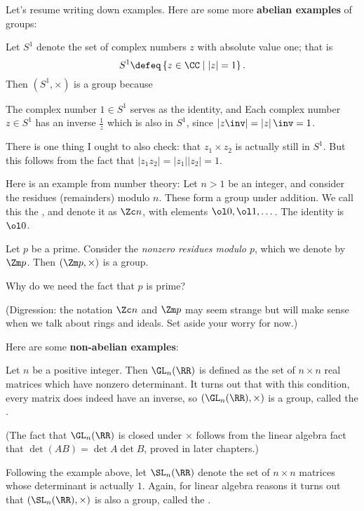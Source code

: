 Let's resume writing down examples.
Here are some more \textbf{abelian examples} of groups:
\begin{example}
	Let $S^1$ denote the set of complex numbers $z$ with absolute value one; that is
	\[ S^1 \defeq \left\{ z \in \CC \mid \left\lvert z \right\rvert = 1 \right\}. \]
	Then $(S^1, \times)$ is a group because
	\begin{itemize}
		\ii The complex number $1 \in S^1$ serves as the identity, and
		\ii Each complex number $z \in S^1$ has an inverse $\frac 1z$ which is also in $S^1$, since $\left\lvert z\inv \right\rvert = \left\lvert z \right\rvert\inv = 1$.
	\end{itemize}
	There is one thing I ought to also check: that $z_1 \times z_2$ is actually still in $S^1$.
	But this follows from the fact that $\left\lvert z_1z_2 \right\rvert = \left\lvert z_1 \right\rvert \left\lvert z_2 \right\rvert = 1$.
\end{example}

\begin{example}
	Here is an example from number theory:
	Let $n > 1$ be an integer,
	and consider the residues (remainders) modulo $n$.
	These form a group under addition.
	We call this the ,
	and denote it as $\Zc n$, with elements $\ol 0, \ol 1, \dots$.
	The identity is $\ol 0$.
	\label{def:cyclic_group}
\end{example}
\begin{example}
	Let $p$ be a prime.
	Consider the \emph{nonzero residues modulo $p$},
	which we denote by $\Zm p$.
	Then $\left( \Zm p, \times \right)$ is a group.
	\label{def:mult_mod_p}
\end{example}
\begin{ques}
	Why do we need the fact that $p$ is prime?
\end{ques}
(Digression: the notation $\Zc n$ and $\Zm p$ may seem strange
but will make sense when we talk about rings and ideals.
Set aside your worry for now.)


Here are some \textbf{non-abelian examples}:
\begin{example}
	Let $n$ be a positive integer.
	Then $\GL_n(\RR)$ is defined as the set of $n \times n$ real matrices
	which have nonzero determinant.
	It turns out that with this condition,
	every matrix does indeed have an inverse,
	so $(\GL_n(\RR), \times)$ is a group, called the
	.

	(The fact that $\GL_n(\RR)$ is closed under $\times$ follows
	from the linear algebra fact that $\det (AB) = \det A \det B$,
	proved in later chapters.)
\end{example}
\begin{example}
	Following the example above, let $\SL_n(\RR)$ denote
	the set of $n \times n$ matrices whose determinant is actually $1$.
	Again, for linear algebra reasons
	it turns out that $(\SL_n(\RR), \times)$ is also a group,
	called the .
\end{example}

